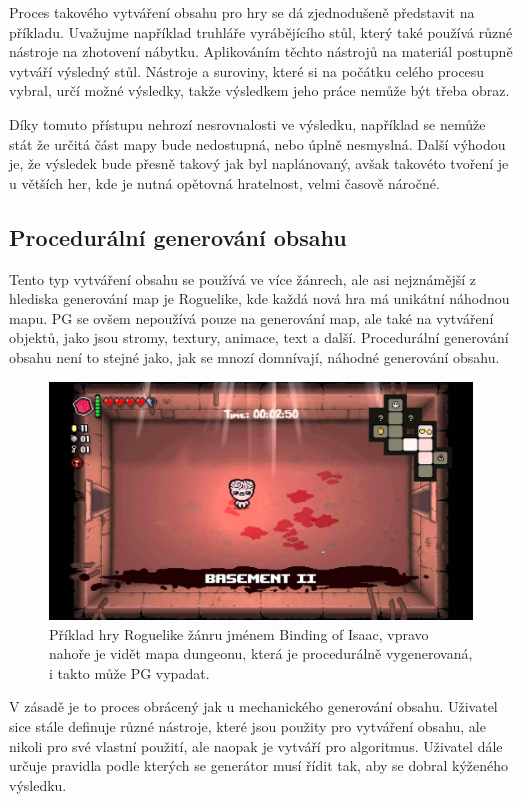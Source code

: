 Proces takového vytváření obsahu pro hry se dá zjednodušeně představit na příkladu. Uvažujme například truhláře vyrábějícího stůl, který také používá různé nástroje na zhotovení nábytku. Aplikováním těchto nástrojů na materiál postupně vytváří výsledný stůl. Nástroje a suroviny, které si na počátku celého procesu vybral, určí možné výsledky, takže výsledkem jeho práce nemůže být třeba obraz.

Díky tomuto přístupu nehrozí nesrovnalosti ve výsledku, například se nemůže stát že určitá část mapy bude nedostupná, nebo úplně nesmyslná. Další výhodou je, že výsledek bude přesně takový jak byl naplánovaný, avšak takovéto tvoření je u větších her, kde je nutná opětovná hratelnost, velmi časově náročné.

\subsection{Procedurální generování obsahu}
\label{procedural}
Tento typ vytváření obsahu se používá ve více žánrech, ale asi nejznámější z hlediska generování map je Roguelike, kde každá nová hra má unikátní náhodnou mapu. PG se ovšem nepoužívá pouze na generování map, ale také na vytváření objektů, jako jsou stromy, textury, animace, text a další. Procedurální generování obsahu není to stejné jako, jak se mnozí domnívají, náhodné generování obsahu.
\begin{figure}[h]
	\centering
	\includegraphics[scale=0.33]{obrazky-figures/BindingOfIsaac.jpg}
	\caption{Příklad hry Roguelike žánru jménem Binding of Isaac, vpravo nahoře je vidět mapa dungeonu, která je procedurálně vygenerovaná, i takto může PG vypadat.}
\end{figure}


V zásadě je to proces obrácený jak u mechanického generování obsahu. Uživatel sice stále definuje různé nástroje, které jsou použity pro vytváření obsahu, ale nikoli pro své vlastní použití, ale naopak je vytváří pro algoritmus. Uživatel dále určuje pravidla podle kterých se generátor musí řídit tak, aby se dobral kýženého výsledku.


